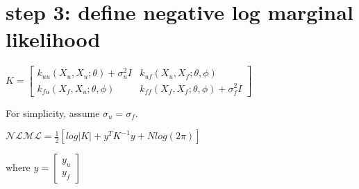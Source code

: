 \documentclass[letterpaper,10pt,english]{sphinxmanual}
\begin{document}
\section{step 3: define negative log marginal likelihood}
\label{\detokenize{report/4-par_est:step-3:-define-negative-log-marginal-likelihood}}
\(K = \begin{bmatrix} k_{uu}(X_u, X_u; \theta) + \sigma_u^2I & k_{uf}(X_u, X_f; \theta, \phi) \\ k_{fu}(X_f, X_u; \theta, \phi) & k_{ff}(X_f, X_f; \theta, \phi) + \sigma_f^2I \end{bmatrix}\)

For simplicity, assume \(\sigma_u = \sigma_f\).

\(\mathcal{NLML} = \frac{1}{2} \left[ log|K| + y^TK^{-1}y + Nlog(2\pi) \right]\)

where \(y = \begin{bmatrix} y_u \\ y_f \end{bmatrix}\)
\end{document}
